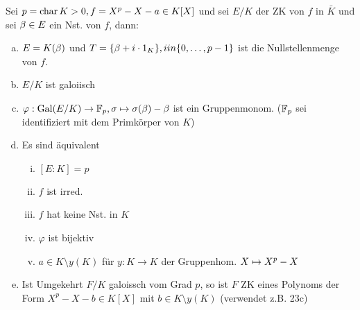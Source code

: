\documentclass[a4paper]{report}
\begin{document}
\begin{satz}
  Sei $p = \operatorname{char} K > 0, f = X^{p} - X - a \in K[X]$ und sei $E/K$ der ZK von $f$ in $\bar K$ und sei $\beta \in E$ ein Nst. von $f$, dann:
  \begin{enumerate}[(a)]
    \item $E = K(\beta)$ und $T = \{\beta + i \cdot 1_{K}\}, i \\in \{0, \ldots, p-1\}$ ist die Nullstellenmenge von $f$.
    \item $E/K$ ist galoiisch
    \item $\varphi: \operatorname{Gal}(E/K) \to \mathbb{F}_{p}, \sigma \mapsto \sigma(\beta) - \beta$ ist ein Gruppenmonom. ($\mathbb{F}_{p}$ sei identifiziert mit dem Primkörper von $K$)
    \item Es sind äquivalent
          \begin{enumerate}[(i)]
            \item $[E:K] = p$
            \item $f$ ist irred.
            \item $f$ hat keine Nst. in $K$
            \item $\varphi$ ist bijektiv
                  \item $a \in K \setminus y(K)$ für $y : K \to K$ der Gruppenhom. $X \mapsto X^{p} - X$
          \end{enumerate}
\item Ist Umgekehrt $F / K$ galoissch vom Grad $p$, so ist $F$ ZK eines Polynoms der Form $X^{p} - X - b \in K[X]$ mit $b \in K \setminus y(K)$ (verwendet z.B. 23c)
  \end{enumerate}

\end{satz}
\end{document}
